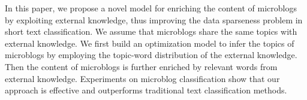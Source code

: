 In this paper, we propose a novel model for enriching the content of microblogs by exploiting external knowledge, thus improving the data sparseness problem in short text classification. We assume that microblogs share the same topics with external knowledge. We first build an optimization model to infer the topics of microblogs by employing the topic-word distribution of the external knowledge. Then the content of microblogs is further enriched by relevant words from external knowledge. Experiments on microblog classification show that our approach is effective and outperforms traditional text classification methods.
